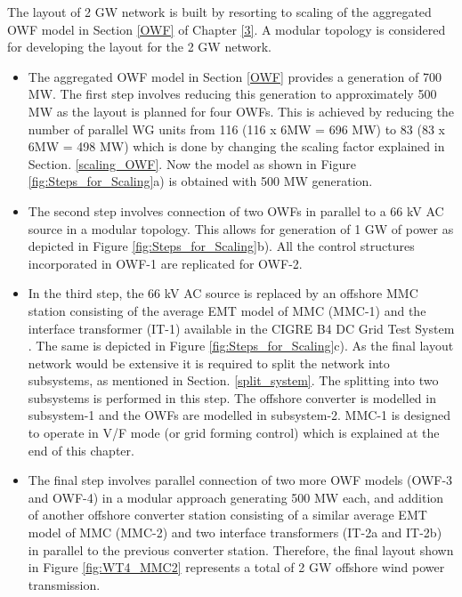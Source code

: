 The layout of 2 GW network is built by resorting to scaling of the aggregated \gls{OWF} model in Section \ref{OWF} of Chapter \ref{3}. A modular topology is considered for developing the layout for the 2 GW network. 

\begin{itemize}
    \item The aggregated \gls{OWF} model in Section \ref{OWF} provides a generation of 700 MW. The first step involves reducing this generation to approximately 500 MW as the layout is planned for four \gls{OWF}s. This is achieved by reducing the number of parallel \gls{WG} units from 116 (116 x 6MW = 696 MW) to 83 (83 x 6MW = 498 MW) which is done by changing the scaling factor explained in Section. \ref{scaling_OWF}. Now the model as shown in Figure \ref{fig:Steps_for_Scaling}a) is obtained with 500 MW generation.
    \item The second step involves connection of two \gls{OWF}s in parallel to a 66 kV \gls{AC} source in a modular topology. This allows for generation of 1 GW of power as depicted in Figure \ref{fig:Steps_for_Scaling}b). All the control structures incorporated in \gls{OWF}-1 are replicated for \gls{OWF}-2.
    \item In the third step, the 66 kV \gls{AC} source is replaced by an offshore \gls{MMC} station consisting of the average \gls{EMT} model of \gls{MMC} (\gls{MMC}-1) and the interface transformer (IT-1) available in the CIGRE B4 DC Grid Test System \cite{vrana2013cigre}. The same is depicted in Figure \ref{fig:Steps_for_Scaling}c). As the final layout network would be extensive it is required to split the network into subsystems, as mentioned in Section. \ref{split_system}. The splitting into two subsystems is performed in this step. The offshore converter is modelled in subsystem-1 and the \gls{OWF}s are modelled in subsystem-2. \gls{MMC}-1 is designed to operate in V/F mode (or grid forming control) which is explained at the end of this chapter.
    \item The final step involves parallel connection of two more \gls{OWF} models (\gls{OWF}-3 and \gls{OWF}-4) in a modular approach generating 500 MW each, and addition of another offshore converter station consisting of a similar average \gls{EMT} model of \gls{MMC} (\gls{MMC}-2) and two interface transformers (IT-2a and IT-2b) in parallel to the previous converter station. Therefore, the final layout shown in Figure \ref{fig:WT4_MMC2} represents a total of 2 GW offshore wind power transmission.
\end{itemize}


